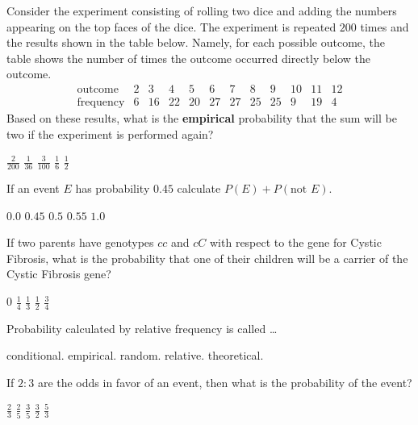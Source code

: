 \documentclass[answers,12pt]{exam}
\begin{document}
\begin{questions}
\question Consider the experiment consisting
of rolling two dice and adding the numbers
appearing on the top faces of the dice.
The experiment is repeated $200$ times and the
results shown in the table below. Namely, 
for each possible outcome, the table shows the number
of times the outcome occurred directly below the outcome.
\[\begin{array}{r|ccccccccccc}
\text{outcome}&2&3&4&5&6&7&8&9&10&11&12\\\hline
\text{frequency}&6&16&22&20&27&27&25&25&9&19&4
\end{array}\]
Based on these results, what is the {\bf empirical} probability
that the sum will be two if the experiment is performed again?\\
\begin{oneparchoices}
\choice $\frac{2}{200}$
\choice $\frac{1}{36}$
\correctchoice $\frac{3}{100}$
\choice $\frac{1}{6}$
\choice $\frac{1}{2}$
\end{oneparchoices}

\question If an event $E$ has probability $0.45$
calculate $P\left(E\right)+P\left(\text{not $E$}\right)$.\\
\begin{oneparchoices}
\choice $0.0$
\choice $0.45$
\choice $0.5$
\choice $0.55$
\correctchoice $1.0$
\end{oneparchoices}

\question If two parents have genotypes $cc$ and $cC$
with respect to the gene for Cystic Fibrosis, what
is the probability that one of their children will be
a carrier of the Cystic Fibrosis gene?\\
\begin{oneparchoices}
\choice $0$
\choice $\frac{1}{4}$
\choice $\frac{1}{3}$
\correctchoice $\frac{1}{2}$
\choice $\frac{3}{4}$
\end{oneparchoices}

\question Probability calculated by relative frequency is called \dots\\
\begin{oneparchoices}
\choice conditional.
\correctchoice empirical.
\choice random.
\choice relative.
\choice theoretical.
\end{oneparchoices}

\question If $2:3$ are the odds in favor
of an event, then what is the probability of the event?\\
\begin{oneparchoices}
\choice $\frac{2}{3}$ %
\correctchoice $\frac{2}{5}$
\choice $\frac{3}{5}$ %
\choice $\frac{3}{2}$ %
\choice $\frac{5}{3}$ %
\end{oneparchoices}
\end{questions}
\end{document}
